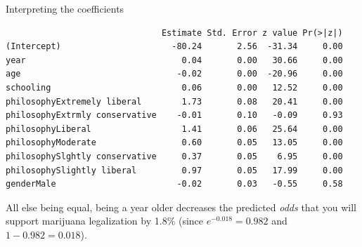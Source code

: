 \documentclass{beamer}\usepackage[]{graphicx}\usepackage[]{color}
\makeatletter
\newcommand{\hlnum}[1]{\textcolor[rgb]{0.824,0.412,0.118}{#1}}%
\newcommand{\hlstr}[1]{\textcolor[rgb]{1,0.894,0.71}{#1}}%
\newcommand{\hlopt}[1]{\textcolor[rgb]{1,0.894,0.769}{#1}}%
\newcommand{\hlstd}[1]{\textcolor[rgb]{1,0.894,0.769}{#1}}%
\newcommand{\hlkwb}[1]{\textcolor[rgb]{0.804,0.776,0.451}{#1}}%
\newcommand{\hlkwc}[1]{\textcolor[rgb]{0.78,0.941,0.545}{#1}}%
\newcommand{\hlkwd}[1]{\textcolor[rgb]{1,0.78,0.769}{#1}}%
\newenvironment{kframe}{%
 \def\at@end@of@kframe{}%
 \ifinner\ifhmode%
  \def\at@end@of@kframe{\end{minipage}}%
  \begin{minipage}{\columnwidth}%
 \fi\fi%
 \def\FrameCommand##1{\hskip\@totalleftmargin \hskip-\fboxsep
 \colorbox{shadecolor}{##1}\hskip-\fboxsep
     \hskip-\linewidth \hskip-\@totalleftmargin \hskip\columnwidth}%
 \MakeFramed {\advance\hsize-\width
   \@totalleftmargin\z@ \linewidth\hsize
   \@setminipage}}%
 {\par\unskip\endMakeFramed%
 \at@end@of@kframe}
\newenvironment{knitrout}{}{} %
\makeatother
\begin{document}
\begin{darkframes}
    \begin{frame}[fragile]{Interpreting the coefficients}
      \fontsize{9}{9}\selectfont
\begin{knitrout}
\begin{kframe}
\begin{verbatim}
                               Estimate Std. Error z value Pr(>|z|)
(Intercept)                      -80.24       2.56  -31.34     0.00
year                               0.04       0.00   30.66     0.00
age                               -0.02       0.00  -20.96     0.00
schooling                          0.06       0.00   12.52     0.00
philosophyExtremely liberal        1.73       0.08   20.41     0.00
philosophyExtrmly conservative    -0.01       0.10   -0.09     0.93
philosophyLiberal                  1.41       0.06   25.64     0.00
philosophyModerate                 0.60       0.05   13.05     0.00
philosophySlghtly conservative     0.37       0.05    6.95     0.00
philosophySlightly liberal         0.97       0.05   17.99     0.00
genderMale                        -0.02       0.03   -0.55     0.58
\end{verbatim}
\end{kframe}
\end{knitrout}
      \fontsize{11}{11}\selectfont
      All else being equal, being a year older decreases the predicted \emph{odds} that you will support marijuana legalization by 1.8\% (since $e^{-0.018} = 0.982$ and $1-0.982 = 0.018$).
    \end{frame}



\end{darkframes}
\end{document}

